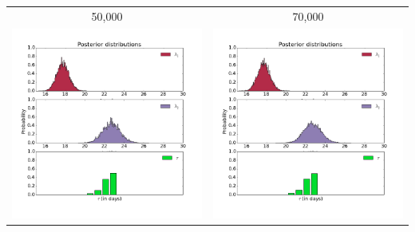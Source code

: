 \documentclass[]{article}
\begin{document}
\begin{enumerate}
\begin{adjustbox}{center}
\begin{tabular}{cc}
50,000 & 70,000 \\
 \includegraphics[scale = 0.22]{n_50000.png} & \includegraphics[scale = 0.22]{n_70000.png} \\

\end{tabular}
\end{adjustbox}
\end{enumerate}
\end{document}
